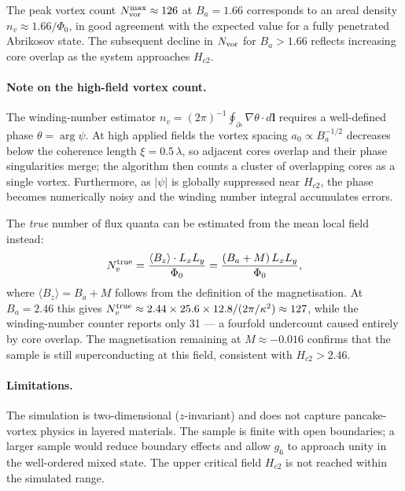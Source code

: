 \documentclass[11pt,a4paper]{article}
\newcommand{\Hctwo}{H_{c2}}
\newcommand{\Ba}{B_a}
\newcommand{\lam}{\lambda}
\begin{document}
The peak vortex count $N_{\rm vor}^{\rm max} \approx 126$ at $\Ba = 1.66$
corresponds to an areal density $n_v \approx 1.66/\Phi_0$, in good agreement
with the expected value for a fully penetrated Abrikosov state.  The
subsequent decline in $N_{\rm vor}$ for $\Ba > 1.66$ reflects increasing core
overlap as the system approaches $\Hctwo$.

\paragraph{Note on the high-field vortex count.}
The winding-number estimator
$n_v = (2\pi)^{-1}\oint_{\partial\square}\nabla\theta\cdot d\mathbf{l}$
requires a well-defined phase $\theta = \arg\psi$.  At high applied fields
the vortex spacing $a_0 \propto \Ba^{-1/2}$ decreases below the coherence
length $\xi = 0.5\,\lam$, so adjacent cores overlap and their phase
singularities merge; the algorithm then counts a cluster of overlapping
cores as a single vortex.  Furthermore, as $|\psi|$ is globally suppressed
near $\Hctwo$, the phase becomes numerically noisy and the winding number
integral accumulates errors.

The \emph{true} number of flux quanta can be estimated from the mean local
field instead:
%
\begin{equation}
  N_v^{\rm true} = \frac{\langle B_z \rangle \cdot L_x L_y}{\Phi_0}
                 = \frac{(\Ba + M)\,L_x L_y}{\Phi_0},
  \label{eq:Nvtrue}
\end{equation}
%
where $\langle B_z\rangle = \Ba + M$ follows from the definition of the
magnetisation.  At $\Ba = 2.46$ this gives
$N_v^{\rm true} \approx 2.44 \times 25.6 \times 12.8 / (2\pi/\kappa^2)
\approx 127$, while the winding-number counter reports only 31 — a
fourfold undercount caused entirely by core overlap.  The magnetisation
remaining at $M \approx -0.016$ confirms that the sample is still
superconducting at this field, consistent with $\Hctwo > 2.46$.

\paragraph{Limitations.}
The simulation is two-dimensional ($z$-invariant) and does not capture
pancake-vortex physics in layered materials.  The sample is finite with
open boundaries; a larger sample would reduce boundary effects and allow
$g_6$ to approach unity in the well-ordered mixed state.  The upper critical
field $\Hctwo$ is not reached within the simulated range.
\end{document}

